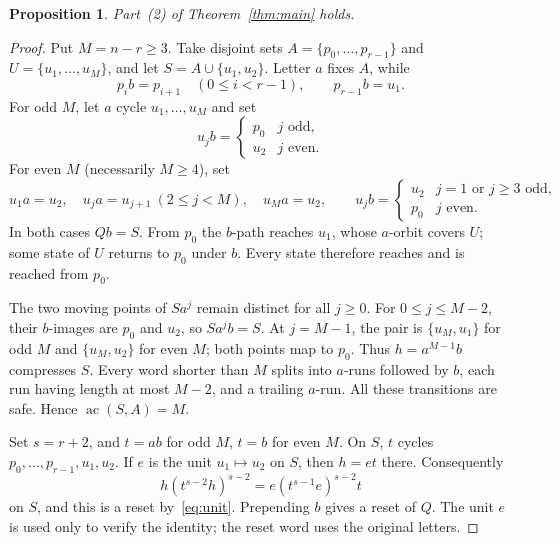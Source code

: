 \documentclass[10pt]{article}
\newtheorem{proposition}[theorem]{Proposition}
\newcommand{\ac}{\operatorname{ac}}
\begin{document}
\begin{proposition}\label{prop:two}
Part~(2) of Theorem~\ref{thm:main} holds.
\end{proposition}
\begin{proof}
Put $M=n-r\ge3$. Take disjoint sets $A=\{p_0,\ldots,p_{r-1}\}$ and $U=\{u_1,\ldots,u_M\}$, and let $S=A\cup\{u_1,u_2\}$. Letter $a$ fixes $A$, while
\[
 p_ib=p_{i+1}\quad(0\le i<r-1),\qquad p_{r-1}b=u_1.
\]
For odd $M$, let $a$ cycle $u_1,\ldots,u_M$ and set
\[
 u_jb=\begin{cases}p_0&j\text{ odd},\\u_2&j\text{ even}.\end{cases}
\]
For even $M$ (necessarily $M\ge4$), set
\[
 u_1a=u_2,\quad u_ja=u_{j+1}\ (2\le j<M),\quad u_Ma=u_2,
 \qquad
 u_jb=\begin{cases}u_2&j=1\text{ or }j\ge3\text{ odd},\\p_0&j\text{ even}.\end{cases}
\]
In both cases $Qb=S$. From $p_0$ the $b$-path reaches $u_1$, whose $a$-orbit covers $U$; some state of $U$ returns to $p_0$ under $b$. Every state therefore reaches and is reached from $p_0$.

The two moving points of $Sa^j$ remain distinct for all $j\ge0$. For $0\le j\le M-2$, their $b$-images are $p_0$ and $u_2$, so $Sa^jb=S$. At $j=M-1$, the pair is $\{u_M,u_1\}$ for odd $M$ and $\{u_M,u_2\}$ for even $M$; both points map to $p_0$. Thus $h=a^{M-1}b$ compresses $S$. Every word shorter than $M$ splits into $a$-runs followed by $b$, each run having length at most $M-2$, and a trailing $a$-run. All these transitions are safe. Hence $\ac(S,A)=M$.

Set $s=r+2$, and $t=ab$ for odd $M$, $t=b$ for even $M$. On $S$, $t$ cycles $p_0,\ldots,p_{r-1},u_1,u_2$. If $e$ is the unit $u_1\mapsto u_2$ on $S$, then $h=et$ there. Consequently
\[
 h(t^{s-2}h)^{s-2}=e(t^{s-1}e)^{s-2}t
\]
on $S$, and this is a reset by~\eqref{eq:unit}. Prepending $b$ gives a reset of $Q$. The unit $e$ is used only to verify the identity; the reset word uses the original letters.
\end{proof}
\end{document}
